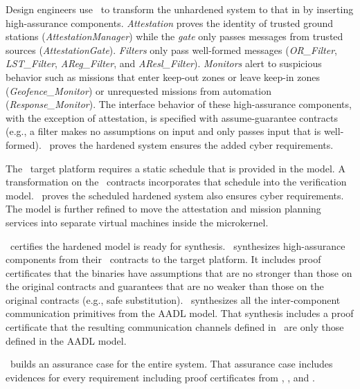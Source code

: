 Design engineers use \briefcase\ to transform the unhardened system to that in  by inserting high-assurance components. 
\emph{Attestation} proves the identity of trusted ground stations (\emph{AttestationManager}) while the \emph{gate} only passes messages from trusted sources (\emph{AttestationGate}).
\emph{Filters} only pass well-formed messages (\emph{OR\_Filter}, \emph{LST\_Filter}, \emph{AReg\_Filter}, and \emph{AResl\_Filter}).
\emph{Monitors} alert to suspicious behavior such as missions that enter keep-out zones or leave keep-in zones (\emph{Geofence\_Monitor}) or unrequested missions from automation (\emph{Response\_Monitor}).
The interface behavior of these high-assurance components, with the exception of attestation, is specified with assume-guarantee contracts (e.g., a filter makes no assumptions on input and only passes input that is well-formed).
\agree\ proves the hardened system ensures the added cyber requirements.

The \selFour\ target platform requires a static schedule that is provided in the model.
A transformation on the \agree\ contracts incorporates that schedule into the verification model.
\agree\ proves the scheduled hardened system also ensures cyber requirements.
The model is further refined to move the attestation and mission planning services into separate virtual machines inside the microkernel.

\resolint\ certifies the hardened model is ready for synthesis.
\splat\ synthesizes high-assurance components from their \agree\ contracts to the target platform.
It includes proof certificates that the binaries have assumptions that are no stronger than those on the original contracts and guarantees that are no weaker than those on the original contracts (e.g., safe substitution).
\hamr\ synthesizes all the inter-component communication primitives from the AADL model.
That synthesis includes a proof certificate that the resulting communication channels defined in \selFour\ are only those defined in the AADL model.

\resolute\ builds an assurance case for the entire system.
That assurance case includes evidences for every requirement including proof certificates from \agree, \splat, and \hamr.
